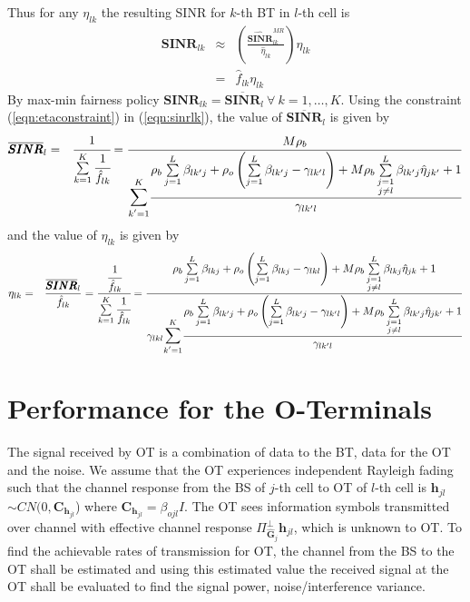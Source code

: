 \documentclass[10pt, a4paper, twoside,fleqn]{article}
\begin{document}
Thus for any $\eta_{lk}$ the resulting SINR for $k$-th BT in $l$-th cell is
\begin{eqnarray}\label{eqn:sinrlk}
\pmb{SINR}_{lk} &\approx & \left(\frac{\pmb{\widehat{SINR}}_{lk}^{MR}}{\hat \eta_{lk}}\right)\eta_{lk} \nonumber \\
                  &=& \hat f_{lk}\eta_{lk}   
\end{eqnarray}
By max-min fairness policy $\pmb{SINR}_{lk} = \overline{\pmb{SINR}}_{l} \ \forall \ k=1,\dotsc, K$. Using the constraint (\ref{eqn:etaconstraint}) in (\ref{eqn:sinrlk}), the value of $\overline{\pmb{SINR}}_{l}$ is given by
\begin{eqnarray}\label{eqn:sinrbar}
\overline{\pmb{SINR}}_{l} &=& \cfrac{1}{\sum\limits_{k=1}^K\cfrac{1}{\hat f_{lk}}}          =\frac{M\rho_b}{\mathlarger{\mathlarger{\sum}}\limits_{k'=1}^{K}\cfrac{\rho_b\sum\limits_{j=1}^{L}\beta_{lk'j}+\rho_o\left(\sum\limits_{j=1}^{L}\beta_{lk'j} -\gamma_{lk'l}\right)+M\rho_b\sum\limits_{\substack{j=1 \\ j \neq l}}^{L}\beta_{lk'j}\hat\eta_{jk'}+1}{\gamma_{lk'l}}}
\end{eqnarray}
 and the value of $\eta_{lk}$ is given by
\begin{eqnarray}\label{eqn:etalkgen}
\eta_{lk} &=& \frac{\overline{\pmb{SINR}}_{l}}{\hat f_{lk}}  = \cfrac{\cfrac{1}{\hat f_{lk}}}{\sum\limits_{k=1}^K\cfrac{1}{\hat f_{lk}}} =\frac{\rho_b\sum\limits_{j=1}^{L}\beta_{lkj}+\rho_o\left(\sum\limits_{j=1}^{L}\beta_{lkj} -\gamma_{lkl}\right)+M\rho_b\sum\limits_{\substack{j=1 \\ j \neq l}}^{L}\beta_{lkj}\hat\eta_{jk}+1}{\gamma_{lkl}\mathlarger{\mathlarger{\sum}}\limits_{k'=1}^{K}\cfrac{\rho_b\sum\limits_{j=1}^{L}\beta_{lk'j}+\rho_o\left(\sum\limits_{j=1}^{L}\beta_{lk'j} -\gamma_{lk'l}\right)+M\rho_b\sum\limits_{\substack{j=1 \\ j \neq l}}^{L}\beta_{lk'j}\hat\eta_{jk'}+1}{\gamma_{lk'l}}}
\end{eqnarray}

\section{Performance for the O-Terminals}
	The signal received by OT is a combination of data to the BT, data for the OT and the noise. We assume that the OT experiences independent Rayleigh fading such that the channel response from the BS of $j$-th cell to OT of $l$-th cell is $\pmb{h}_{jl}$ $\sim CN(0,\pmb{C}_{\pmb{h}_{jl}}$) where $\pmb{C}_{\pmb{h}_{jl}} = \beta_{ojl}I$. The OT sees information symbols transmitted over channel with effective channel response $\Pi^{\perp}_{{\widehat{\pmb{G}}_j}}\pmb{h}_{jl}$, which is unknown to OT. To find the achievable rates of transmission for OT, the channel from the BS to the OT shall be estimated and using this estimated value the received signal at the OT shall be evaluated to find the signal power, noise/interference variance.
\end{document}
